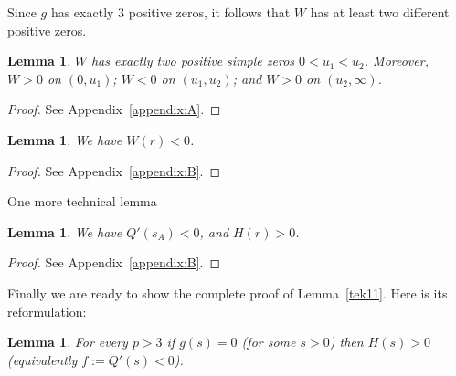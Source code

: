 \documentclass[11pt]{article}
\newtheorem{lemma}[theorem]{Lemma}
\theoremstyle{definition}
\newcommand{\1}{\mathbf{1}}
\begin{document}
\vskip1cm 
Since $g$ has exactly 3 positive zeros, it follows that $W$ has at least two different positive zeros.  

\begin{lemma}\label{lem: W has two zeros}
$W$ has exactly two positive simple zeros $0<u_{1}<u_{2}$. Moreover, $W>0$ on $(0, u_{1})$; $W<0$ on $(u_{1}, u_{2})$; and $W>0$ on $(u_{2}, \infty)$. 
\end{lemma}

\begin{proof}
 See Appendix~\ref{appendix:A}.
\end{proof}

\begin{lemma}\label{lem: W(r)<0}
We have $W(r)<0$. 
\end{lemma}
\begin{proof}
 See Appendix~\ref{appendix:B}.
\end{proof}

One more technical lemma
\begin{lemma}\label{lem: tecnichal lemma about Q'sA and Hr}
 We have $Q'(s_{A})<0$, and $H(r)>0$.  
\end{lemma}
\begin{proof}
 See Appendix~\ref{appendix:B}.
\end{proof}


Finally we are ready to show the complete proof of Lemma~\ref{tek11}. Here is its reformulation: 

\begin{lemma}
For every $p>3$ if $g(s)=0$ (for some $s>0$) then $H(s)>0$ (equivalently $f:=Q'(s)<0$).
\end{lemma}
\end{document}
